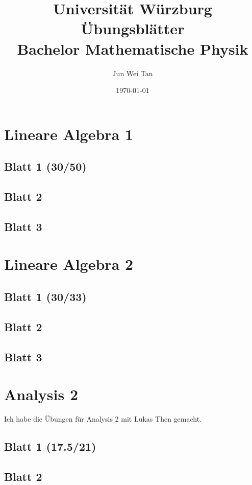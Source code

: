 \documentclass{tuftebook}
\numberwithin{Theorem}{chapter}
\theoremstyle{definition}
\theoremstyle{definition}
\begin{document}
	\title{Universit\"{a}t W\"{u}rzburg \"{U}bungsbl\"{a}tter\\Bachelor Mathematische Physik}
	\author{Jun Wei Tan}
	\date{\today}
	\maketitle
	\tableofcontents

\chapter{Lineare Algebra 1}
\section{Blatt 1 (30/50)}

\section{Blatt 2}

\section{Blatt 3}


\chapter{Lineare Algebra 2}
\section{Blatt 1 (30/33)}

\section{Blatt 2}

\section{Blatt 3}


\chapter{Analysis 2}
Ich habe die Übungen für Analysis 2 mit Lukas Then gemacht.
\section{Blatt 1 (17.5/21)}

\section{Blatt 2}

\end{document}
